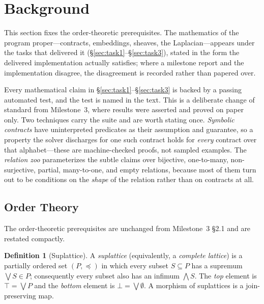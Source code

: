 \documentclass[11pt]{article}
\newif\ifshowcomments
\renewcommand{\preceq}{\preccurlyeq}
\theoremstyle{definition}
\newtheorem{definition}{Definition}
\theoremstyle{remark}
\newcommand{\task}[1]{%
    \ifshowcomments
        ~\todo[inline, color=buzzgold!60, textcolor=black,caption={Task}]{{\bf Task:} #1}%
    \fi
}
\begin{document}
\section{Background}
\label{sec:background}

\task{Review the mathematical content of the Milestone~3 report and correct it where the
implementation and its test suite show it to be wrong.}

This section fixes the order-theoretic prerequisites.
The mathematics of the program proper---contracts, embeddings, sheaves, the Laplacian---appears
under the tasks that delivered it (\S\ref{sec:task1}--\S\ref{sec:task3}), stated in the form
the delivered implementation actually satisfies; where a milestone report and the
implementation disagree, the disagreement is recorded rather than papered over.

Every mathematical claim in \S\ref{sec:task1}--\S\ref{sec:task3} is backed by a passing
automated test, and the test is named in the text.
This is a deliberate change of standard from Milestone~3, where results were asserted and
proved on paper only.
Two techniques carry the suite and are worth stating once.
\emph{Symbolic contracts} have uninterpreted predicates as their assumption and guarantee, so a
property the solver discharges for one such contract holds for \emph{every} contract over that
alphabet---these are machine-checked proofs, not sampled examples.
The \emph{relation zoo} parameterizes the subtle claims over bijective, one-to-many,
non-surjective, partial, many-to-one, and empty relations, because most of them turn out to be
conditions on the \emph{shape} of the relation rather than on contracts at all.

\subsection{Order Theory}
\label{sec:order}

The order-theoretic prerequisites are unchanged from Milestone~3 \S2.1 and are restated
compactly.

\begin{definition}[Suplattice]
A \emph{suplattice} (equivalently, a \emph{complete lattice}) is a partially ordered set
$(P, \preceq)$ in which every subset $S \subseteq P$ has a supremum $\bigvee S \in P$;
consequently every subset also has an infimum $\bigwedge S$.
The \emph{top} element is $\top = \bigvee P$ and the \emph{bottom} element is
$\bot = \bigvee \emptyset$.
A morphism of suplattices is a join-preserving map.
\end{definition}
\end{document}
